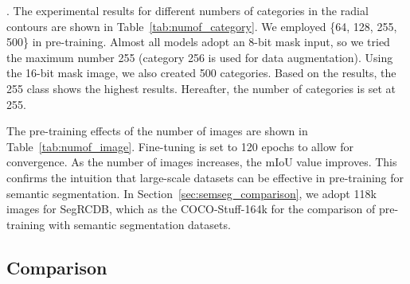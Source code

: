 \documentclass[10pt,twocolumn,letterpaper]{article}
\newcommand{\cRio}[1]{{\color{black}{#1}}} %
\begin{document}
. The experimental results for different numbers of categories in the radial contours are shown in Table~\ref{tab:numof_category}. We employed \{64, 128, 255, 500\} in pre-training.
Almost all models adopt an 8-bit mask input, so we tried the maximum number 255 (category 256 is used for data augmentation). Using the 16-bit mask image, we also created 500 categories.
Based on the results, the 255 class shows the highest results. Hereafter, the number of categories is set at 255.

 The pre-training effects of the number of images are shown in Table~\ref{tab:numof_image}. Fine-tuning is set to 120 epochs to allow for convergence. As the number of images increases, the mIoU value improves. This confirms the intuition that large-scale datasets can be effective in pre-training for semantic segmentation.
In Section~\ref{sec:semseg_comparison},  we adopt 118k images for SegRCDB, which \cRio{has the same number of training images} as the COCO-Stuff-164k for the comparison of pre-training with semantic segmentation datasets.


\subsection{Comparison}
\end{document}
